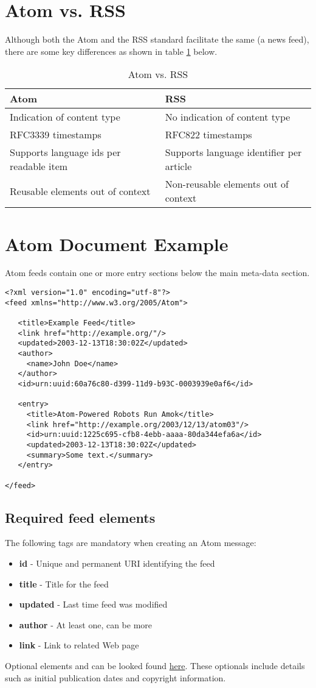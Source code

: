 \section{Atom vs. RSS}
Although both the Atom and the RSS standard facilitate the same (a news feed), there are some key differences as shown in table \ref{tab:atomvsrss} below.

\begin{table}[h]
	\begin{tabular}{|l|l|}
	\hline
	Atom & RSS \\ \hline
	Indication of content type & No indication of content type \\
	RFC3339 timestamps & RFC822 timestamps \\
	Supports language ids per readable item & Supports language identifier per article \\
	Reusable elements out of context & Non-reusable elements out of context \\
	\hline
	\end{tabular}
	\caption{Atom vs. RSS}
	\label{tab:atomvsrss}
\end{table}

\section{Atom Document Example}
Atom feeds contain one or more entry sections below the main meta-data section.

\begin{lstlisting}[style=xml, frame=single, caption={feed.xml}]
<?xml version="1.0" encoding="utf-8"?>
<feed xmlns="http://www.w3.org/2005/Atom">

   <title>Example Feed</title>
   <link href="http://example.org/"/>
   <updated>2003-12-13T18:30:02Z</updated>
   <author>
     <name>John Doe</name>
   </author>
   <id>urn:uuid:60a76c80-d399-11d9-b93C-0003939e0af6</id>

   <entry>
     <title>Atom-Powered Robots Run Amok</title>
     <link href="http://example.org/2003/12/13/atom03"/>
     <id>urn:uuid:1225c695-cfb8-4ebb-aaaa-80da344efa6a</id>
     <updated>2003-12-13T18:30:02Z</updated>
     <summary>Some text.</summary>
   </entry>

</feed>
\end{lstlisting}

\subsection{Required feed elements}
The following tags are mandatory when creating an Atom message:
\begin{itemize}
  \item \textbf{id} - Unique and permanent URI identifying the feed
  \item \textbf{title} - Title for the feed
  \item \textbf{updated} - Last time feed was modified
  \item \textbf{author} - At least one, can be more
  \item \textbf{link} - Link to related Web page
\end{itemize}

Optional elements and can be looked found \href{http://www.atomenabled.org/developers/syndication/#optionalEntryElements}{here}. These optionals include details such as initial publication dates and copyright information.

%
